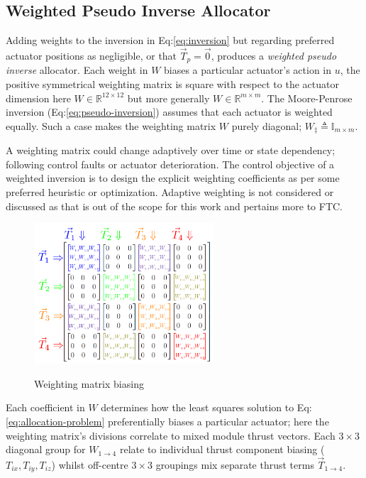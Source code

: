 \subsection{Weighted Pseudo Inverse Allocator}
\label{subsec:allocation.allocators.weightedinverse}
Adding weights to the inversion in Eq:\ref{eq:inversion} but regarding preferred actuator positions as negligible, or that $\vec{T}_p=\vec{0}$, produces a \emph{weighted pseudo inverse} allocator. Each weight in $W$ biases a particular actuator's action in $u$, the positive symmetrical weighting matrix is square with respect to the actuator dimension here $W\in\mathbb{R}^{12\times 12}$ but more generally $W\in\mathbb{R}^{m\times m}$. The Moore-Penrose inversion (Eq:\ref{eq:pseudo-inversion}) assumes that each actuator is weighted equally. Such a case makes the weighting matrix $W$ purely diagonal; $W_\ddagger\triangleq\mathbb{I}_{m\times m}$. 
\par
A weighting matrix could change adaptively over time or state dependency; following control faults or actuator deterioration. The control objective of a weighted inversion is to design the explicit weighting coefficients as per some preferred heuristic or optimization. Adaptive weighting is not considered or discussed as that is out of the scope for this work and pertains more to FTC\cite{FTCallocation}.
\par
\begin{figure}[htbp]
\vspace{-6pt}
\centering
\includegraphics[width=0.6\textwidth]{figs/weighted-matrix}
\label{fig:weighted-matrix}
\vspace{-6pt}
\caption{Weighting matrix biasing}
\vspace{-6pt}
\end{figure}
Each coefficient in $W$ determines how the least squares solution to Eq:\ref{eq:allocation-problem} preferentially biases a particular actuator; here the weighting matrix's divisions correlate to mixed module thrust vectors. Each $3\times 3$ diagonal group for $W_{1\rightarrow 4}$ relate to individual thrust component biasing ($T_{ix},T_{iy},T_{iz}$) whilst off-centre $3\times 3$ groupings mix separate thrust terms $\vec{T}_{1\rightarrow 4}$. 
